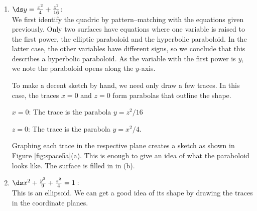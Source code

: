 {\begin{enumerate}
	\item $\ds y=\frac{x^2}{4}+\frac{z^2}{16}$:\\[5pt]
	We first identify the quadric by pattern--matching with the equations given previously. Only two surfaces have equations where one variable is raised to the first power, the elliptic paraboloid and the hyperbolic paraboloid. In the latter case, the other variables have different signs, so we conclude that this describes a hyperbolic paraboloid. As the variable with the first power is $y$, we note the paraboloid opens along the $y$-axis. 
	
	To make a decent sketch by hand, we need only draw a few traces. In this case, the traces $x=0$ and $z=0$ form parabolas that outline the shape.
	
	$x=0$:	The trace is the parabola $y=z^2/16$
	
	$z=0$: 	The trace is the parabola $y=x^2/4$.
	
	Graphing each trace in the respective plane creates a sketch as shown in Figure \ref{fig:space5a}(a). This is enough to give an idea of what the paraboloid looks like. The surface is filled in in (b).
	
	\item		$\ds x^2+\frac{y^2}{9}+\frac{z^2}{4}=1:$\\[5pt]
	This is an ellipsoid. We can get a good idea of its shape by drawing the traces in the coordinate planes.
	

\end{enumerate}}
